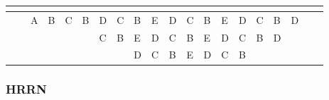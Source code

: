 \documentclass[a4]{article}
\begin{document}
\begin{table}[h!]
\begin{tabular}{|l|l|l|l|l|l|l|l|l|l|l|l|l|l|l|l|l|l|l|l|}
        \multicolumn{10}{|l|}{}                        & \cellcolor[HTML]{656565} & \multicolumn{3}{l|}{}    & \cellcolor[HTML]{656565} & \multicolumn{5}{l|}{}                                                                                                                                                                                                                                                                     \\ \hline
                                                       &                          & A                        & B                        & C                     & B                        & D                     & C                                             & B                     & E                        & D                     & C                        & B                     & E  & D  & C  & B  & D  &    &    \\ \hline
                                                       &                          &                          &                          &                       &                          & C                     & B                                             & E                     & D                        & C                     & B                        & E                     & D  & C  & B  & D  &    &    &    \\ \hline
                                                       &                          &                          &                          &                       &                          &                       &                                               & D                     & C                        & B                     & E                        & D                     & C  & B  &    &    &    &    &    \\ \hline
    \end{tabular}
\end{table}

\subsubsection{HRRN}
\end{document}
